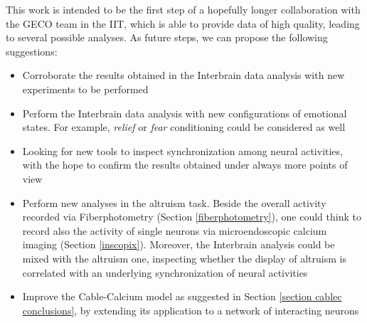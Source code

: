 \documentclass[12pt, a4paper]{report}
\begin{document}
This work is intended to be the first step of a hopefully longer collaboration with the GECO team in the IIT, which is able to provide data of high quality, leading to several possible analyses. As future steps, we can propose the following suggestions:

\begin{itemize}
	\item Corroborate the results obtained in the Interbrain data analysis with new experiments to be performed
	
	\item Perform the Interbrain data analysis with new configurations of emotional states. For example, \textit{relief} or \textit{fear} conditioning could be considered as well
	
	
	\item Looking for new tools to inspect synchronization among neural activities, with the hope to confirm the results obtained under always more points of view
	
	\item Perform new analyses in the altruism task. Beside the overall activity recorded via Fiberphotometry (Section \ref{fiberphotometry}), one could think to record also the activity of single neurons via microendoscopic calcium imaging (Section \ref{inscopix}). Moreover, the Interbrain analysis could be mixed with the altruism one, inspecting whether the display of altruism is correlated with an underlying synchronization of neural activities
	
	\item Improve the Cable-Calcium model as suggested in Section \ref{section cablec conclusions}, by extending its application to a network of interacting neurons
\end{itemize}
\end{document}
